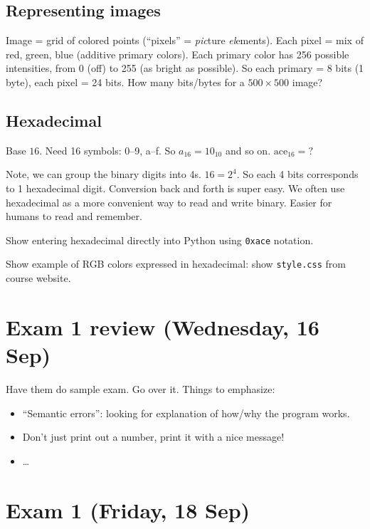 \documentclass{article}
\begin{document}
\subsection*{Representing images}

Image = grid of colored points (``pixels'' = \emph{pic}ture
\emph{el}ements).  Each pixel = mix of red, green, blue (additive
primary colors).  Each primary color has 256 possible intensities,
from 0 (off) to 255 (as bright as possible).  So each primary = 8 bits
(1 byte), each pixel = 24 bits.  How many bits/bytes for a $500 \times
500$ image?

\subsection*{Hexadecimal}

Base $16$.  Need 16 symbols: 0--9, a--f. So $a_{16} = 10_{10}$ and so
on. $\mbox{ace}_{16} = ?$

Note, we can group the binary digits into 4s.  $16 = 2^4$.  So each 4
bits corresponds to 1 hexadecimal digit.  Conversion back and forth is
super easy.  We often use hexadecimal as a more convenient way to read
and write binary.  Easier for humans to read and remember.

Show entering hexadecimal directly into Python using \verb|0xace|
notation.

Show example of RGB colors expressed in hexadecimal: show
\verb|style.css| from course website.

\newpage

\section{Exam 1 review (Wednesday, 16 Sep)}

Have them do sample exam. Go over it.  Things to emphasize:
\begin{itemize}
\item ``Semantic errors'': looking for explanation of how/why the
  program works.
\item Don't just print out a number, print it with a nice message!
\item \dots
\end{itemize}

\section{Exam 1 (Friday, 18 Sep)}

\newpage
\end{document}
